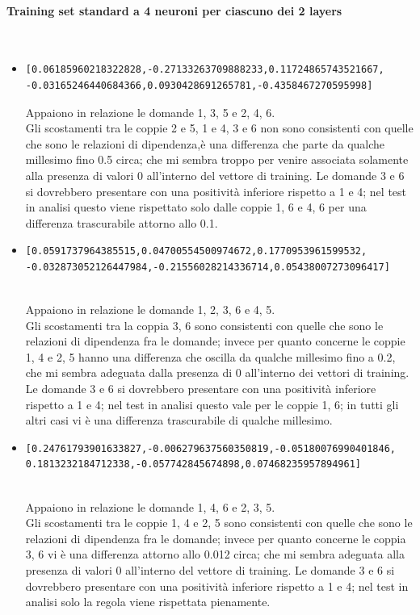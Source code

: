 \paragraph{Training set standard a 4 neuroni per ciascuno dei 2 layers}\mbox{}
\label{Training set standard a 4 neuroni per ciascuno dei 2 layers}
\\
\noindent
\begin{itemize}
\item \begin{verbatim}[0.06185960218322828,-0.27133263709888233,0.11724865743521667,
-0.03165246440684366,0.0930428691265781,-0.4358467270595998] \end{verbatim}
Appaiono in relazione le domande 1, 3, 5 e 2, 4, 6.\\
Gli scostamenti tra le coppie 2 e 5, 1 e 4, 3 e 6 non sono consistenti con quelle che sono le relazioni di dipendenza,\`e una differenza che parte da qualche millesimo fino 0.5 circa; che mi sembra troppo per venire associata solamente alla presenza di valori 0 all'interno del vettore di training.
Le domande 3 e 6 si dovrebbero presentare con una positivit\`a inferiore rispetto a 1 e 4; nel test in analisi questo viene rispettato solo dalle coppie 1, 6 e 4, 6  per una differenza trascurabile attorno allo 0.1.

\item \begin{verbatim}[0.0591737964385515,0.04700554500974672,0.1770953961599532,
-0.032873052126447984,-0.21556028214336714,0.05438007273096417]\end{verbatim}\\
Appaiono in relazione le domande 1, 2, 3, 6 e 4, 5.\\
Gli scostamenti tra la coppia 3, 6 sono consistenti con quelle che sono le relazioni di dipendenza fra le domande; invece per quanto concerne le coppie 1, 4 e 2, 5 hanno una differenza che oscilla da qualche millesimo fino a 0.2, che mi sembra adeguata dalla presenza di 0 all'interno dei vettori di training.
Le domande 3 e 6 si dovrebbero presentare con una positivit\`a inferiore rispetto a 1 e 4; nel test in analisi questo vale per le coppie 1, 6; in tutti gli altri casi vi \`e una differenza trascurabile di qualche millesimo.

\item \begin{verbatim}[0.24761793901633827,-0.006279637560350819,-0.05180076990401846,
0.1813232184712338,-0.057742845674898,0.07468235957894961]
\end{verbatim}\\
Appaiono in relazione le domande 1, 4, 6 e 2, 3, 5.\\
Gli scostamenti tra le  coppie 1, 4 e 2, 5 sono consistenti con quelle che sono le relazioni di dipendenza fra le domande; invece per quanto concerne le coppia 3, 6 vi \`e una differenza attorno allo 0.012 circa; che mi sembra adeguata alla presenza di valori 0 all'interno del vettore di training.
Le domande 3 e 6 si dovrebbero presentare con una positivit\`a inferiore rispetto a 1 e 4; nel test in analisi solo la regola viene rispettata pienamente.


\end{itemize}
